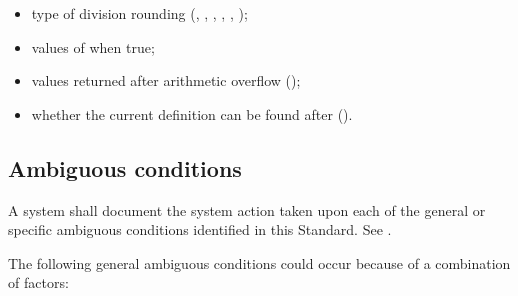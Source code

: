 \begin{itemize}
\item type of division rounding (,
	, , ,
	, );

\item values of  when true;

\item values returned after arithmetic overflow
	();

\item whether the current definition can be found after
	 ().

\end{itemize}



\subsection{Ambiguous conditions} %

A system shall document the system action taken upon each of the
general or specific ambiguous conditions identified in this
Standard. See .

The following general ambiguous conditions could occur because of a
combination of factors:

